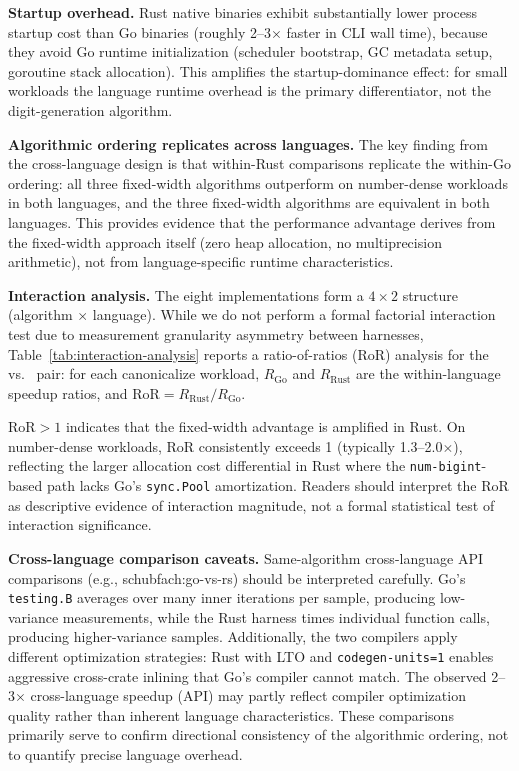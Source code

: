 \textbf{Startup overhead.}  Rust native binaries exhibit substantially
lower process startup cost than Go binaries (roughly 2--3$\times$ faster
in CLI wall time), because they avoid Go runtime initialization (scheduler
bootstrap, GC metadata setup, goroutine stack allocation).  This
amplifies the startup-dominance effect: for small workloads the language
runtime overhead is the primary differentiator, not the digit-generation
algorithm.

\textbf{Algorithmic ordering replicates across languages.}  The key finding
from the cross-language design is that within-Rust comparisons replicate
the within-Go ordering: all three fixed-width algorithms outperform
\burgerdybvig on number-dense workloads in both languages, and the three
fixed-width algorithms are equivalent in both languages.  This provides
evidence that the performance advantage derives from the fixed-width
approach itself (zero heap allocation, no multiprecision arithmetic),
not from language-specific runtime characteristics.

\textbf{Interaction analysis.}  The eight implementations form
a $4 \times 2$ structure (algorithm $\times$ language).  While we do not
perform a formal factorial interaction test due to measurement granularity
asymmetry between harnesses, Table~\ref{tab:interaction-analysis} reports
a ratio-of-ratios (RoR) analysis for the \schubfach vs.\ \burgerdybvig
pair: for each canonicalize workload, $R_\text{Go}$ and $R_\text{Rust}$
are the within-language speedup ratios, and
$\text{RoR} = R_\text{Rust}/R_\text{Go}$.



$\text{RoR} > 1$ indicates that the fixed-width advantage is amplified in
Rust.  On number-dense workloads, $\text{RoR}$ consistently exceeds 1
(typically 1.3--2.0$\times$), reflecting the larger allocation cost
differential in Rust where the \texttt{num-bigint}-based path lacks Go's
\texttt{sync.Pool} amortization.  Readers should interpret the RoR as
descriptive evidence of interaction magnitude, not a formal statistical
test of interaction significance.

\textbf{Cross-language comparison caveats.}  Same-algorithm
cross-language API comparisons (e.g., schubfach:go-vs-rs) should be
interpreted carefully.  Go's \texttt{testing.B} averages over many
inner iterations per sample, producing low-variance measurements, while
the Rust harness times individual function calls, producing
higher-variance samples.  Additionally, the two compilers apply
different optimization strategies: Rust with LTO and
\texttt{codegen-units=1} enables aggressive cross-crate inlining that
Go's compiler cannot match.  The observed 2--3$\times$ cross-language
speedup (API) may partly reflect compiler optimization quality rather
than inherent language characteristics.  These comparisons primarily
serve to confirm directional consistency of the algorithmic ordering,
not to quantify precise language overhead.

